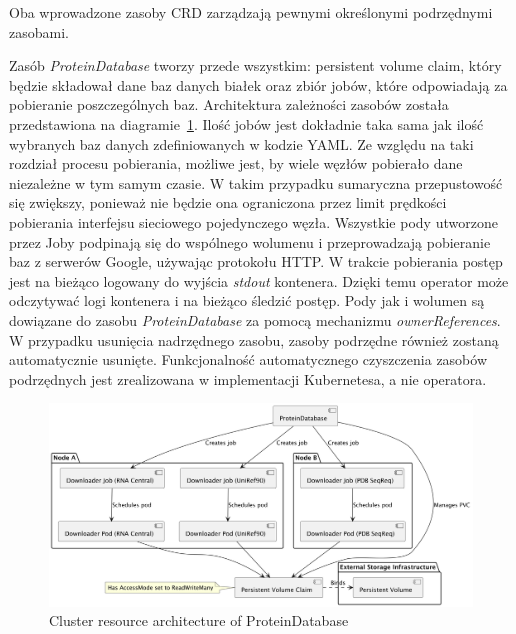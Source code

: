 Oba wprowadzone zasoby CRD zarządzają pewnymi określonymi podrzędnymi zasobami.

Zasób \textit{ProteinDatabase} tworzy przede wszystkim: persistent volume claim, który będzie składował dane baz danych białek oraz zbiór jobów, które odpowiadają za pobieranie poszczególnych baz.
Architektura zależności zasobów została przedstawiona na diagramie~\ref{fig:proteindatabase}.
Ilość jobów jest dokładnie taka sama jak ilość wybranych baz danych zdefiniowanych w kodzie YAML.
Ze względu na taki rozdział procesu pobierania, możliwe jest, by wiele węzłów pobierało dane niezależne w tym samym czasie.
W takim przypadku sumaryczna przepustowość się zwiększy, ponieważ nie będzie ona ograniczona przez limit prędkości pobierania interfejsu sieciowego pojedynczego węzła.
Wszystkie pody utworzone przez Joby podpinają się do wspólnego wolumenu i przeprowadzają pobieranie baz z serwerów Google, używając protokołu HTTP.
W trakcie pobierania postęp jest na bieżąco logowany do wyjścia \textit{stdout} kontenera.
Dzięki temu operator może odczytywać logi kontenera i na bieżąco śledzić postęp.
Pody jak i wolumen są dowiązane do zasobu \textit{ProteinDatabase} za pomocą mechanizmu \textit{ownerReferences}.
W przypadku usunięcia nadrzędnego zasobu, zasoby podrzędne również zostaną automatycznie usunięte.
Funkcjonalność automatycznego czyszczenia zasobów podrzędnych jest zrealizowana w implementacji Kubernetesa, a nie operatora.

\begin{figure}[htbp]
    \centering
    \includegraphics[width=\textwidth]{images/proteindatabase}
    \caption{Cluster resource architecture of ProteinDatabase}
    \label{fig:proteindatabase}
\end{figure}

